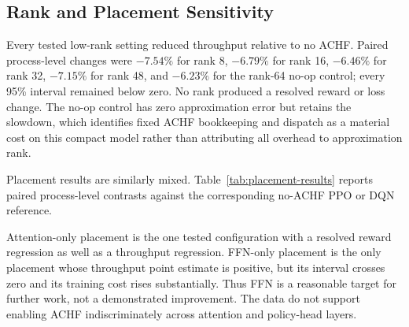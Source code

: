 \documentclass{article}
\begin{document}
\subsection{Rank and Placement Sensitivity}

Every tested low-rank setting reduced throughput relative to no ACHF. Paired
process-level changes were $-7.54\%$ for rank 8, $-6.79\%$ for rank 16,
$-6.46\%$ for rank 32, $-7.15\%$ for rank 48, and $-6.23\%$ for the rank-64
no-op control; every 95\% interval remained below zero. No rank produced a
resolved reward or loss change. The no-op control has zero approximation error
but retains the slowdown, which identifies fixed ACHF bookkeeping and dispatch
as a material cost on this compact model rather than attributing all overhead
to approximation rank.

Placement results are similarly mixed. Table~\ref{tab:placement-results}
reports paired process-level contrasts against the corresponding no-ACHF PPO or
DQN reference.

\begin{table}[t]
\centering
\caption{Placement sensitivity. Values are paired mean [95\% CI]; training-time
deltas are seconds.}
\label{tab:placement-results}
\small
{}
\end{table}

Attention-only placement is the one tested configuration with a resolved
reward regression as well as a throughput regression. FFN-only placement is
the only placement whose throughput point estimate is positive, but its
interval crosses zero and its training cost rises substantially. Thus FFN is a
reasonable target for further work, not a demonstrated improvement. The data
do not support enabling ACHF indiscriminately across attention and policy-head
layers.
\end{document}
